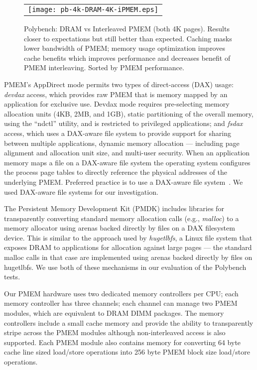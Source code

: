 
\begin{figure}[!th]
  \captionsetup{justification=centering}
  \centering
  \caption{Polybench: DRAM vs Interleaved PMEM (both 4K pages).  Results closer to expectations but still better than expected.  Caching masks lower bandwidth of PMEM; memory usage optimization improves cache benefits which improves performance and decreases benefit of PMEM interleaving. Sorted by PMEM performance.}
  \vspace{2mm}
  \label{fig:polybench:dram-vs-ipmem-4k}
  \begin{tabular}{c}
    \texttt{[image: pb-4k-DRAM-4K-iPMEM.eps]}
  \end{tabular}
\end{figure}


PMEM's AppDirect mode permits two types of direct-access (DAX) usage: \textit{devdax} access, which provides raw PMEM that is memory mapped by an application for exclusive use. Devdax mode requires pre-selecting memory allocation units (4KB, 2MB, and 1GB), static partitioning of the overall memory, using the ``ndctl'' utility, and is restricted to privileged applications; and \textit{fsdax} access, which uses a DAX-aware file system to provide support for sharing between multiple applications, dynamic memory allocation --- including page alignment and allocation unit size, and multi-user security.  When an application memory maps a file on a DAX-aware file system the operating system configures the process page tables to directly reference the physical addresses of the underlying PMEM.  Preferred practice is to use a DAX-aware file system~\cite{rudoff2019NVMProgrammingModel}. We used DAX-aware file systems for our investigation.


The Persistent Memory Development Kit (PMDK) includes libraries for transparently converting standard memory allocation calls (e.g., \textit{malloc}) to a memory allocator using arenas backed directly by files on a DAX filesystem device.  This is similar to the approach used by \textit{hugetlbfs}, a Linux file system that exposes DRAM to applications for allocation against large pages --- the standard malloc calls in that case are implemented using arenas backed directly by files on hugetlbfs.  We use both of these mechanisms in our evaluation of the Polybench tests.

Our PMEM hardware uses two dedicated memory controllers per CPU; each memory controller has three channels; each channel can manage two PMEM modules, which are equivalent to DRAM DIMM packages.   The memory controllers include a small cache memory and provide the ability to transparently stripe across the PMEM modules although non-interleaved access is also supported.  Each PMEM module also contains memory for converting 64 byte cache line sized load/store operations into 256 byte PMEM block size load/store operations.

